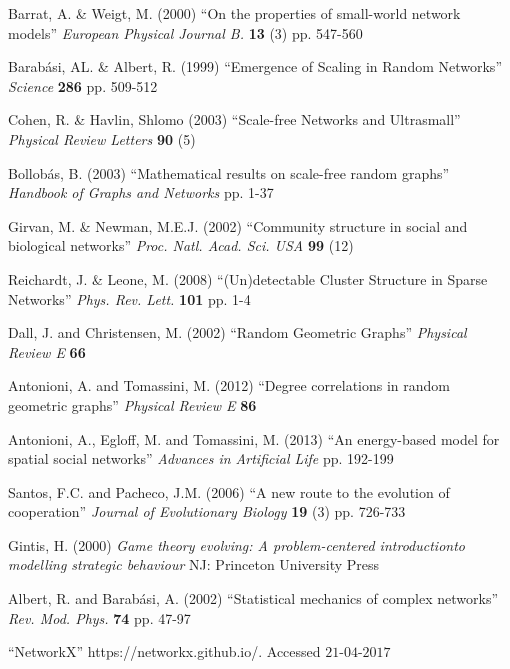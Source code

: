 \documentclass[a4paper, 12pt, notitlepage]{report}
\numberwithin{equation}{subsection}
\theoremstyle{definition}
\theoremstyle{theorem}
\theoremstyle{definition}
\begin{document}
\begin{thebibliography}{9}
Barrat, A. \& Weigt, M. (2000) ``On the properties of small-world network models'' \emph{European Physical Journal B.} \textbf{13} (3) pp. 547-560

Barab\'{a}si, AL. \& Albert, R. (1999) ``Emergence of Scaling in Random Networks'' \emph{Science} \textbf{286} pp. 509-512

Cohen, R. \& Havlin, Shlomo (2003) ``Scale-free Networks and Ultrasmall'' \emph{Physical Review Letters} \textbf{90} (5)

Bollob\'{a}s, B. (2003) ``Mathematical results on scale-free random graphs'' \emph{Handbook of Graphs and Networks} pp. 1-37

Girvan, M. \& Newman, M.E.J. (2002) ``Community structure in social and biological networks'' \emph{Proc. Natl. Acad. Sci. USA} \textbf{99} (12)

Reichardt, J. \& Leone, M. (2008) ``(Un)detectable Cluster Structure in Sparse Networks'' \emph{Phys. Rev. Lett.} \textbf{101} pp. 1-4

Dall, J. and Christensen, M. (2002) ``Random Geometric Graphs'' \emph{Physical Review E} \textbf{66}

Antonioni, A. and Tomassini, M. (2012) ``Degree correlations in random geometric graphs'' \emph{Physical Review E} \textbf{86}

Antonioni, A., Egloff, M. and Tomassini, M. (2013) ``An energy-based model for spatial social networks'' \emph{Advances in Artificial Life} pp. 192-199

Santos, F.C. and Pacheco, J.M. (2006) ``A new route to the evolution of cooperation'' \emph{Journal of Evolutionary Biology} \textbf{19} (3) pp. 726-733

Gintis, H. (2000) \emph{Game theory evolving: A problem-centered introductionto modelling strategic behaviour} NJ: Princeton University Press

Albert, R. and Barab\'{a}si, A. (2002) ``Statistical mechanics of complex networks'' \emph{Rev. Mod. Phys.} \textbf{74} pp. 47-97

``NetworkX'' https://networkx.github.io/. Accessed $21$-$04$-$2017$
\end{thebibliography}
\end{document}
